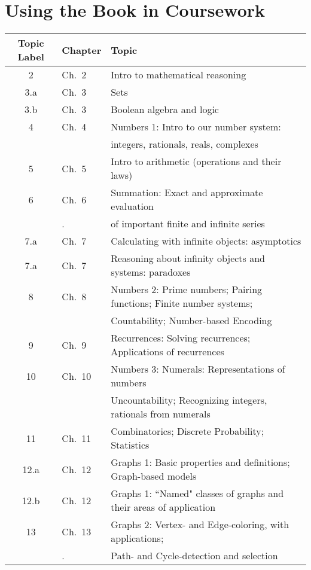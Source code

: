 \documentclass{article}
\begin{document}
\section*{Using the Book in Coursework}

\bigskip

{\footnotesize

\begin{tabular}{|cl|l|}
\hline
{\bf Topic Label} & {\bf Chapter} & {\bf Topic} \\
\hline
\hline
2     & Ch.~2  & Intro to mathematical reasoning \\
3.a  & Ch.~3  & Sets \\
3.b  & Ch.~3  & Boolean algebra and logic \\
4     & Ch.~4  & Numbers 1: Intro to our number system: \\
       &              & integers, rationals, reals, complexes \\
5     & Ch.~5  &Intro to arithmetic (operations and their laws) \\
6     & Ch.~6  & Summation: Exact and approximate evaluation \\
       &.             & of important finite and infinite series   \\
7.a  & Ch.~7  & Calculating with infinite objects: asymptotics \\
7.a  & Ch.~7  & Reasoning about infinity objects and systems: paradoxes \\
8     & Ch.~8  & Numbers 2: Prime numbers; Pairing functions; Finite number systems; \\
       &             & Countability; Number-based Encoding  \\
9     & Ch.~9  & Recurrences: Solving recurrences; Applications of recurrences \\
10   & Ch.~10 & Numbers 3: Numerals: Representations of numbers \\
       &              & Uncountability; Recognizing integers, rationals from numerals \\
11   & Ch.~11  & Combinatorics; Discrete Probability; Statistics \\
12.a & Ch.~12 & Graphs 1: Basic properties and definitions; Graph-based models \\
12.b & Ch.~12 & Graphs 1: ``Named" classes of graphs and their areas of application \\
13    & Ch.~13 & Graphs 2: Vertex- and Edge-coloring, with applications; \\
        &.             & Path- and Cycle-detection and selection \\
\hline
\end{tabular}
}
\end{document}
